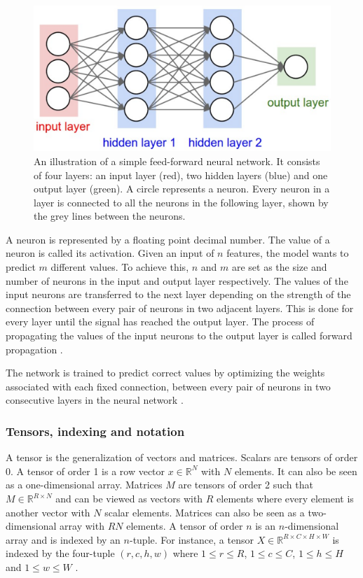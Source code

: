 \documentclass[a4paper, twoside]{article}
\begin{document}
\begin{figure}[h]
	\centering
  		\includegraphics[scale=1]{feedforward.png}
  	\caption{An illustration \cite{hidden12} of a simple feed-forward neural network. It consists of four layers: an input layer (red), two hidden layers (blue) and one output layer (green). A circle represents a neuron. Every neuron in a layer is connected to all the neurons in the following layer, shown by the grey lines between the neurons. } \label{figfeedforward}
\end{figure}

A neuron is represented by a floating point decimal number. The value of a neuron is called its activation. Given an input of $n$ features, the model wants to predict $m$ different values. To achieve this, $n$ and $m$ are set as the size and number of neurons in the input and output layer respectively. The values of the input neurons are transferred to the next layer depending on the strength of the connection between every pair of neurons in two adjacent layers. This is done for every layer until the signal has reached the output layer. The process of propagating the values of the input neurons to the output layer is called forward propagation \cite{cs231n}.

The network is trained to predict correct values by optimizing the weights associated with each fixed connection, between every pair of neurons in two consecutive layers in the neural network \cite{cs231n}.

\subsubsection{Tensors, indexing and notation}
A tensor is the generalization of vectors and matrices. Scalars are tensors of order 0. A tensor of order 1 is a row vector $x \in \mathbb{R}^N$ with $N$ elements. It can also be seen as a one-dimensional array. Matrices $M$ are tensors of order 2 such that $M \in \mathbb{R}^{R \times N}$ and can be viewed as vectors with $R$ elements where every element is another vector with $N$ scalar elements. Matrices can also be seen as a two-dimensional array with $RN$ elements. A tensor of order $n$ is an $n$-dimensional array and is indexed by an $n$-tuple. For instance, a tensor $X \in \mathbb{R}^{R \times C \times H \times W}$ is indexed by the four-tuple $(r,c,h,w)$ where $1 \leq r \leq R$, $1 \leq c \leq C$, $1 \leq h \leq H$ and $1 \leq w \leq W$ \cite{cs231n}.
\end{document}
